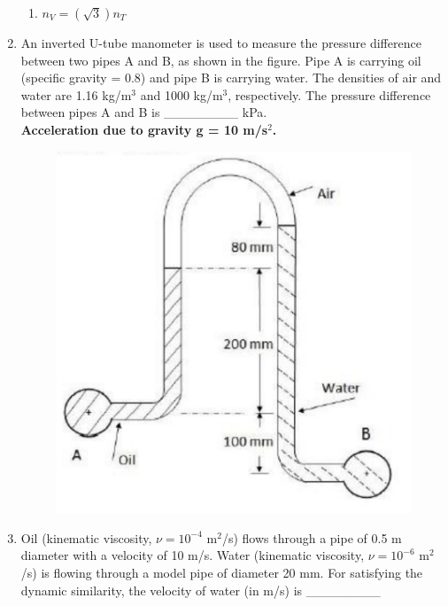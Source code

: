 \documentclass[journal,11pt,onecolumn]{IEEEtran}
\begin{document}
\begin{enumerate}[resume]
\begin{enumerate}
              \item $n_V = (\sqrt{3})n_T$

          \end{enumerate}

    \item An inverted U-tube manometer is used to measure the pressure difference between two pipes A and B, as shown in the figure. Pipe A is carrying oil (specific gravity = 0.8) and pipe B is carrying water. The densities of air and water are 1.16 kg/m$^3$ and 1000 kg/m$^3$, respectively. The pressure difference between pipes A and B is \_\_\_\_\_\_\_\_ kPa.\\
          \textbf{Acceleration due to gravity g = 10 m/s$^2$.}
          \begin{figure}[H]
              \centering
              \includegraphics[scale=0.3]{q39}
              \caption{}
              \label{q39}
          \end{figure}

    \item Oil (kinematic viscosity, $\nu = 10^{-4}$ m$^2$/s) flows through a pipe of 0.5 m diameter with a velocity of 10 m/s. Water (kinematic viscosity, $\nu = 10^{-6}$ m$^2$/s) is flowing through a model pipe of diameter 20 mm. For satisfying the dynamic similarity, the velocity of water (in m/s) is \_\_\_\_\_\_\_\_


\end{enumerate}
\end{document}
